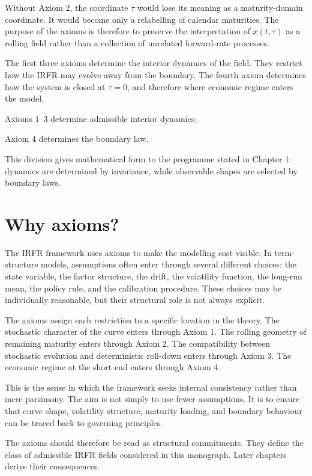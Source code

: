 \documentclass[11pt,oneside]{book}
\begin{document}
Without Axiom 2, the coordinate $\tau$ would lose its meaning as a
maturity-domain coordinate. It would become only a relabelling of
calendar maturities. The purpose of the axioms is therefore to preserve
the interpretation of $x(t,\tau)$ as a rolling field rather than a collection
of unrelated forward-rate processes.

The first three axioms determine the interior dynamics of the field.
They restrict how the IRFR may evolve away from the boundary. The fourth
axiom determines how the system is closed at $\tau=0$, and therefore where
economic regime enters the model.

Axioms 1--3 determine admissible interior dynamics;

Axiom 4 determines the boundary law.

This division gives mathematical form to the programme stated in Chapter
1: dynamics are determined by invariance, while observable shapes are
selected by boundary laws.

\section{Why axioms?}\label{why-axioms}

The IRFR framework uses axioms to make the modelling cost visible. In
term-structure models, assumptions often enter through several different
choices: the state variable, the factor structure, the drift, the
volatility function, the long-run mean, the policy rule, and the
calibration procedure. These choices may be individually reasonable, but
their structural role is not always explicit.

The axioms assign each restriction to a specific location in the theory.
The stochastic character of the curve enters through Axiom 1. The
rolling geometry of remaining maturity enters through Axiom 2. The
compatibility between stochastic evolution and deterministic roll-down
enters through Axiom 3. The economic regime at the short end enters
through Axiom 4.

This is the sense in which the framework seeks internal consistency
rather than mere parsimony. The aim is not simply to use fewer
assumptions. It is to ensure that curve shape, volatility structure,
maturity loading, and boundary behaviour can be traced back to governing
principles.

The axioms should therefore be read as structural commitments. They
define the class of admissible IRFR fields considered in this monograph.
Later chapters derive their consequences.
\end{document}
